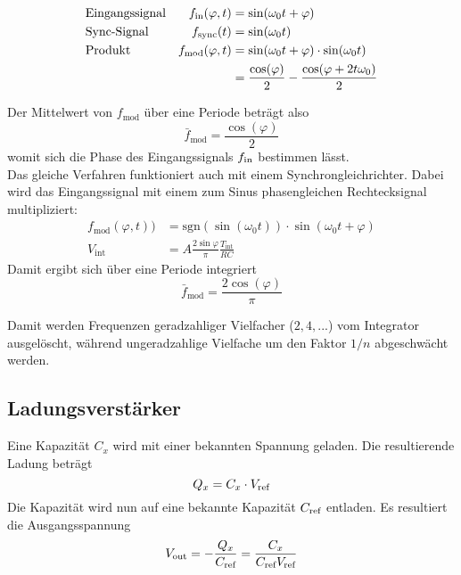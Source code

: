\begin{align*}
	& \text{Eingangssignal} & f_{\operatorname{\text{in}}}(\varphi,t) &= \sin(\omega_0 t + \varphi) \\
	& \text{Sync-Signal} & f_{\text{sync}}(t) &= \sin(\omega_0 t) \\
	& \text{Produkt} & f_{\text{mod}}(\varphi,t) &= \sin(\omega_0 t + \varphi) \cdot \sin(\omega_0 t) \\
	& & &= \frac{\cos(\varphi)}{2} - \frac{\cos(\varphi + 2 t \omega_0)}{2}
\end{align*}

Der Mittelwert von $f_{\text{mod}}$ über eine Periode beträgt also
\begin{equation*}
	\bar{f}_{\text{mod}} = \frac{\cos(\varphi)}{2}
\end{equation*}
womit sich die Phase des Eingangssignals $f_{\operatorname{\text{in}}}$ bestimmen lässt. \\

Das gleiche Verfahren funktioniert auch mit einem Synchrongleichrichter. 
Dabei wird das Eingangssignal mit einem zum Sinus phasengleichen Rechtecksignal
multipliziert:
\begin{align*}
	f_{\text{mod}}(\varphi,t)) &= \text{sgn}\left(\sin(\omega_0 t)\right) \cdot \sin(\omega_0 t + \varphi) \\
	V_{\text{int}} &= A \frac{2 \sin \varphi}{\pi} \frac{T_{\text{int}}}{R C}
\end{align*}
Damit ergibt sich über eine Periode integriert
\begin{equation*}
	\bar{f}_{\text{mod}} = \frac{2 \cos(\varphi)}{\pi}
\end{equation*}

Damit werden Frequenzen geradzahliger Vielfacher ($2,4,...$) vom Integrator
ausgelöscht, während ungeradzahlige Vielfache um den Faktor $1/n$
abgeschwächt werden.

\subsection{Ladungsverstärker}
Eine Kapazität $C_x$ wird mit einer bekannten Spannung geladen. Die resultierende
Ladung beträgt
\begin{equation*}
	Q_x = C_x \cdot V_{\operatorname{\text{ref}}}
\end{equation*}
Die Kapazität wird nun auf eine bekannte Kapazität $C_{\operatorname{\text{ref}}}$ entladen. 
Es resultiert die Ausgangsspannung
\begin{equation*}
	V_{\operatorname{\text{out}}} = - \frac{Q_x}{C_{\operatorname{\text{ref}}}} = \frac{C_x}{C_{\operatorname{\text{ref}}} V_{\operatorname{\text{ref}}}}
\end{equation*}